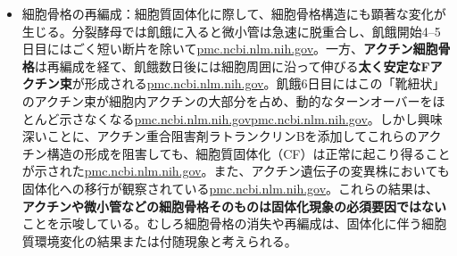 \begin{itemize}
    \item 細胞骨格の再編成：細胞質固体化に際して、細胞骨格構造にも顕著な変化が生じる。分裂酵母では飢餓に入ると微小管は急速に脱重合し、飢餓開始4–5日目にはごく短い断片を除いて\href{https://pmc.ncbi.nlm.nih.gov/articles/PMC6857596/\#:~:text=Microtubules\%20can\%20be\%20virtually\%20excluded\%2C,confirmed\%20this\%20result\%20by\%20imaging}{pmc.ncbi.nlm.nih.gov}。一方、\textbf{アクチン細胞骨格}は再編成を経て、飢餓数日後には細胞周囲に沿って伸びる\textbf{太く安定なFアクチン束}が形成される\href{https://pmc.ncbi.nlm.nih.gov/articles/PMC6857596/\#:~:text=curled\%20around\%20the\%20cell\%20ends,circumference\%2C\%20while\%20curling\%20around\%20both}{pmc.ncbi.nlm.nih.gov}。飢餓6日目にはこの「靴紐状」のアクチン束が細胞内アクチンの大部分を占め、動的なターンオーバーをほとんど示さなくなる\href{https://pmc.ncbi.nlm.nih.gov/articles/PMC6857596/\#:~:text=curled\%20around\%20the\%20cell\%20ends,circumference\%2C\%20while\%20curling\%20around\%20both}{pmc.ncbi.nlm.nih.gov}\href{https://pmc.ncbi.nlm.nih.gov/articles/PMC6857596/\#:~:text=SD6\%20did\%20not\%20affect\%20the,on\%20SD3\%29\%20and}{pmc.ncbi.nlm.nih.gov}。しかし興味深いことに、アクチン重合阻害剤ラトランクリンBを添加してこれらのアクチン構造の形成を阻害しても、細胞質固体化（CF）は正常に起こり得ることが示された\href{https://pmc.ncbi.nlm.nih.gov/articles/PMC6857596/\#:~:text=and\%20Methods\%29,experiment\%2C\%20LatB\%20significantly\%20interferes\%20with}{pmc.ncbi.nlm.nih.gov}。また、アクチン遺伝子の変異株においても固体化への移行が観察されている\href{https://pmc.ncbi.nlm.nih.gov/articles/PMC6857596/\#:~:text=and\%20Methods\%29,experiment\%2C\%20LatB\%20significantly\%20interferes\%20with}{pmc.ncbi.nlm.nih.gov}。これらの結果は、\textbf{アクチンや微小管などの細胞骨格そのものは固体化現象の必須要因ではない}ことを示唆している。むしろ細胞骨格の消失や再編成は、固体化に伴う細胞質環境変化の結果または付随現象と考えられる。

\end{itemize}
